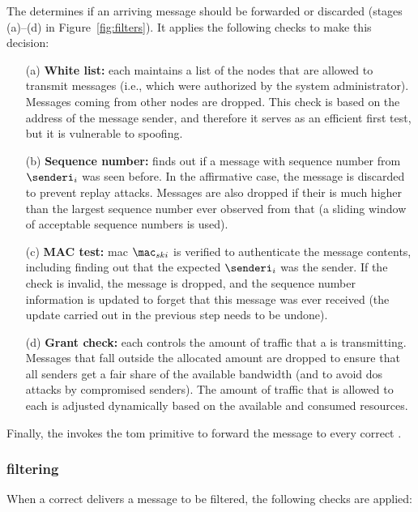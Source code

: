 The \presieve determines if an arriving message \msg should be forwarded or discarded (stages (a)--(d) in Figure~\ref{fig:filters}). It applies the following checks to make this decision:

\begin{enumerate}

\item[(a)] \textbf{White list:} each \presieve maintains a list of the nodes that are allowed to transmit messages (i.e., which were authorized by the system administrator). 
Messages coming from other nodes are dropped.
This check is based on the address of the message sender, and therefore it serves as an efficient first test, but it is vulnerable to spoofing.

\item[(b)]  \textbf{Sequence number:} finds out if a message with sequence number \sn from \sender $\senderi_i$ was seen before.
In the affirmative case, the message is discarded to prevent replay attacks.
Messages are also dropped if their \sn is much higher than the largest sequence number ever observed from that \sender (a sliding window of acceptable sequence numbers is used).

\item[(c)]  \textbf{MAC test:} \gls{mac} $\mac_{ski}$ is verified to authenticate the message contents, including finding out that the expected $\senderi_i$  was the sender. 
If the check is invalid, the message is dropped, and the sequence number information is updated to forget that this message was ever received (the update carried out in the previous step needs to be undone).

\item[(d)] \textbf{Grant check:} each \presieve controls the amount of traffic that a \sender is transmitting.
Messages that fall outside the allocated amount are dropped to ensure that all senders get a fair share of the available bandwidth (and to avoid \gls{dos} attacks by compromised senders).
The amount of traffic that is allowed to each \sender is adjusted dynamically based on the available and consumed resources.


\end{enumerate}

Finally, the \presieve invokes the \gls{tom} primitive to forward the message to every correct \repsieve.

\subsubsection{\Repsieve filtering}
\label{sec:repseivefiltering}
When a correct \repsieve delivers a message to be filtered, the following checks are applied:

